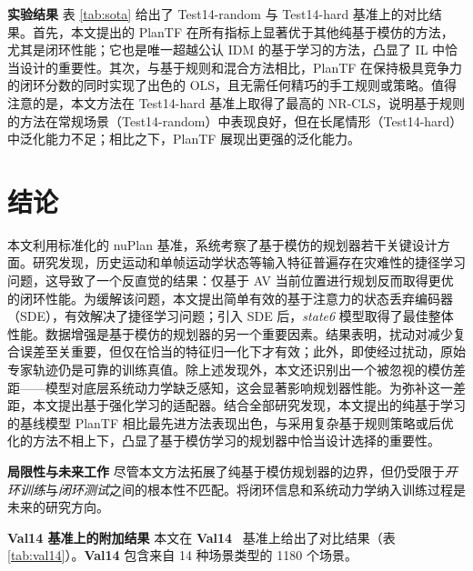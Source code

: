 \documentclass[letterpaper, 10 pt, conference]{ieeeconf}  %
\renewcommand{\paragraph}[1]{\vspace{1.25mm}\noindent\textbf{#1}}
\begin{document}
\paragraph{实验结果}
表 \ref{tab:sota} 给出了 Test14-random 与 Test14-hard 基准上的对比结果。首先，本文提出的 PlanTF 在所有指标上显著优于其他纯基于模仿的方法，尤其是闭环性能；它也是唯一超越公认 IDM 的基于学习的方法，凸显了 IL 中恰当设计的重要性。其次，与基于规则和混合方法相比，PlanTF 在保持极具竞争力的闭环分数的同时实现了出色的 OLS，且无需任何精巧的手工规则或策略。值得注意的是，本文方法在 Test14-hard 基准上取得了最高的 NR-CLS，说明基于规则的方法在常规场景（Test14-random）中表现良好，但在长尾情形（Test14-hard）中泛化能力不足；相比之下，PlanTF 展现出更强的泛化能力。

\section{结论}

本文利用标准化的 nuPlan 基准，系统考察了基于模仿的规划器若干关键设计方面。研究发现，历史运动和单帧运动学状态等输入特征普遍存在灾难性的捷径学习问题，这导致了一个反直觉的结果：仅基于 AV 当前位置进行规划反而取得更优的闭环性能。为缓解该问题，本文提出简单有效的基于注意力的状态丢弃编码器（SDE），有效解决了捷径学习问题；引入 SDE 后，\textit{state6} 模型取得了最佳整体性能。数据增强是基于模仿的规划器的另一个重要因素。结果表明，扰动对减少复合误差至关重要，但仅在恰当的特征归一化下才有效；此外，即使经过扰动，原始专家轨迹仍是可靠的训练真值。除上述发现外，本文还识别出一个被忽视的模仿差距——模型对底层系统动力学缺乏感知，这会显著影响规划器性能。为弥补这一差距，本文提出基于强化学习的适配器。结合全部研究发现，本文提出的纯基于学习的基线模型 PlanTF 相比最先进方法表现出色，与采用复杂基于规则策略或后优化的方法不相上下，凸显了基于模仿学习的规划器中恰当设计选择的重要性。

\paragraph{局限性与未来工作}
尽管本文方法拓展了纯基于模仿规划器的边界，但仍受限于\textit{开环训练}与\textit{闭环测试}之间的根本性不匹配。将闭环信息和系统动力学纳入训练过程是未来的研究方向。

\appendix

\paragraph{Val14 基准上的附加结果} 本文在 \textbf{Val14}~\cite{Dauner2023CORL} 基准上给出了对比结果（表 \ref{tab:val14}）。\textbf{Val14} 包含来自 14 种场景类型的 1180 个场景。
\end{document}
